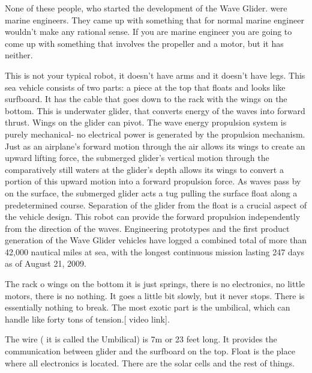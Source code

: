 None of these people, who started the development of the Wave Glider. were marine engineers. They came up with something that for normal marine engineer wouldn't make any rational sense. If you are marine engineer you are going to come up with something that involves the propeller and a motor, but it has neither.


This is not your typical robot, it doesn't have arms and it doesn't have legs. This sea  vehicle consists of two parts: a piece at the top that floats  and looks like surfboard. It has the cable that goes down to the rack with the wings on the bottom. This is underwater glider, that converts energy of the waves into forward thrust. Wings on the glider can pivot. The wave energy propulsion system is purely mechanical- no electrical power is generated by the propulsion mechanism. Just as an airplane’s forward motion through the air allows its wings to create an upward lifting force, the submerged glider’s vertical motion through the comparatively still waters at the glider’s depth allows its wings to convert a portion of this upward motion into a forward propulsion force. As waves pass by on the surface, the submerged glider acts a tug pulling the surface float along a predetermined course. Separation of the glider from the float is a crucial aspect of the vehicle design. This robot can provide the forward propulsion independently from the direction of the waves. Engineering prototypes and the first product generation of the Wave Glider vehicles have logged a combined total of more than 42,000 nautical miles at sea, with the longest continuous mission lasting 247 days as of August 21, 2009. \cite{5422129}


The rack o wings on the  bottom it is just springs, there is no electronics, no little motors, there is no nothing. It goes a little bit slowly, but it never stops. There is  essentially nothing to break. The most exotic part is the umbilical, which can handle like forty tons of tension.[ video link].


The wire ( it is called the Umbilical)  is  7m or 23 feet long. It provides the communication between  glider and the  surfboard on the top. Float is the place where all electronics  is located. There are the solar cells and the rest of things.


